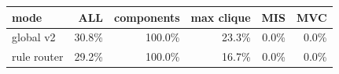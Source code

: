 \begin{tabular}{lrrrrr}
\toprule
mode & ALL & components & max clique & MIS & MVC \\
\midrule
global v2 & 30.8\% & 100.0\% & 23.3\% & 0.0\% & 0.0\% \\
rule router & 29.2\% & 100.0\% & 16.7\% & 0.0\% & 0.0\% \\
\bottomrule
\end{tabular}
